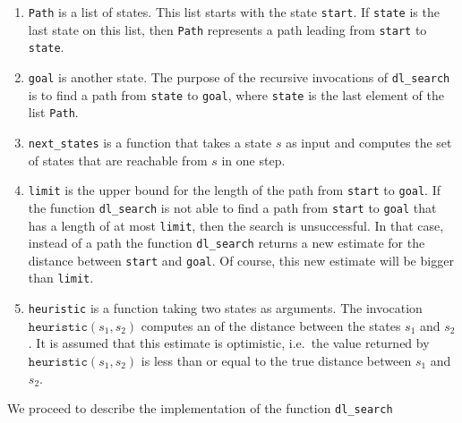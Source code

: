 \begin{enumerate}
\item \texttt{Path} is a list of states.  This list starts with the state \texttt{start}.
      If \texttt{state} is the last state on this list, then \texttt{Path} represents a path leading from
      \texttt{start} to \texttt{state}.
\item \texttt{goal} is another state.  The purpose of the recursive invocations of \texttt{dl\_search} is to
      find a path from \texttt{state} to \texttt{goal}, where \texttt{state} is the last element of the
      list \texttt{Path}.
\item \texttt{next\_states} is a function that takes a state $s$ as input and computes the set of states that are
      reachable from $s$ in one step.
\item \texttt{limit} is the upper bound for the length of the path from \texttt{start} to \texttt{goal}.  If the
      function \texttt{dl\_search} is not able to find a path from \texttt{start} to \texttt{goal} that has
      a length of at most \texttt{limit}, then the search is unsuccessful.  In that case, instead of a path
      the function \texttt{dl\_search} returns a new estimate for the distance between \texttt{start} and
      \texttt{goal}.  Of course, this new estimate will be bigger than \texttt{limit}.
\item \texttt{heuristic} is a function taking two states as arguments.  The invocation
      $\texttt{heuristic}(s_1, s_2)$ computes an  of the distance between the states $s_1$ and $s_2$.  It is
      assumed that this estimate is optimistic, i.e.~the value returned by $\texttt{heuristic}(s_1, s_2)$
      is less than or equal to the true distance between $s_1$ and $s_2$.
\end{enumerate}
We proceed to describe the implementation of the function \texttt{dl\_search}
